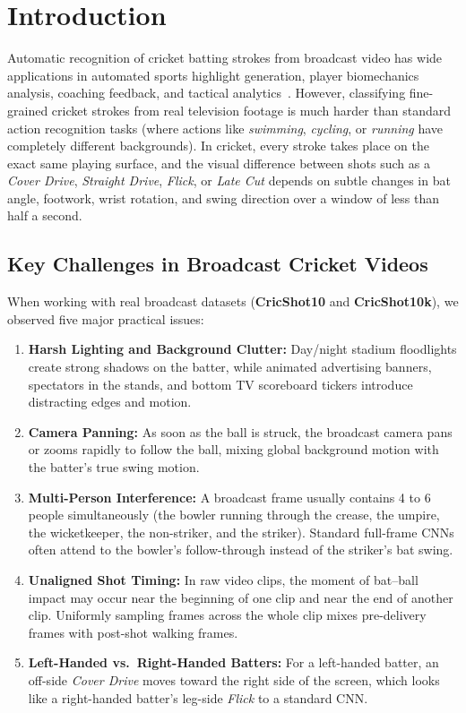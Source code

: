 \section{Introduction}
\label{sec:intro}

Automatic recognition of cricket batting strokes from broadcast video has wide applications in automated sports highlight generation, player biomechanics analysis, coaching feedback, and tactical analytics~\cite{sen2021cricshot10}. However, classifying fine-grained cricket strokes from real television footage is much harder than standard action recognition tasks (where actions like \textit{swimming}, \textit{cycling}, or \textit{running} have completely different backgrounds). In cricket, every stroke takes place on the exact same playing surface, and the visual difference between shots such as a \textit{Cover Drive}, \textit{Straight Drive}, \textit{Flick}, or \textit{Late Cut} depends on subtle changes in bat angle, footwork, wrist rotation, and swing direction over a window of less than half a second.

\subsection{Key Challenges in Broadcast Cricket Videos}
When working with real broadcast datasets (\textbf{CricShot10} and \textbf{CricShot10k}), we observed five major practical issues:
\begin{enumerate}
    \item \textbf{Harsh Lighting and Background Clutter:} Day/night stadium floodlights create strong shadows on the batter, while animated advertising banners, spectators in the stands, and bottom TV scoreboard tickers introduce distracting edges and motion.
    \item \textbf{Camera Panning:} As soon as the ball is struck, the broadcast camera pans or zooms rapidly to follow the ball, mixing global background motion with the batter's true swing motion.
    \item \textbf{Multi-Person Interference:} A broadcast frame usually contains 4 to 6 people simultaneously (the bowler running through the crease, the umpire, the wicketkeeper, the non-striker, and the striker). Standard full-frame CNNs often attend to the bowler's follow-through instead of the striker's bat swing.
    \item \textbf{Unaligned Shot Timing:} In raw video clips, the moment of bat--ball impact may occur near the beginning of one clip and near the end of another clip. Uniformly sampling frames across the whole clip mixes pre-delivery frames with post-shot walking frames.
    \item \textbf{Left-Handed vs.\ Right-Handed Batters:} For a left-handed batter, an off-side \textit{Cover Drive} moves toward the right side of the screen, which looks like a right-handed batter's leg-side \textit{Flick} to a standard CNN.
\end{enumerate}

